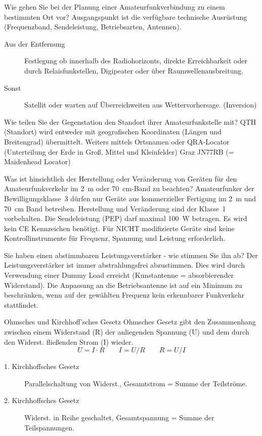 \documentclass[avery5371,grid,frame,a4paper]{flashcards}
\newcommand{\card}[3]{
  \begin{flashcard}[{\chap} -- #1]{#2}#3\end{flashcard}
}
\newcommand\class[1]{{\footnotesize [Klassen: #1]}}
\begin{document}
\card{35}{Wie gehen Sie bei der Planung einer Amateurfunkverbindung zu einem bestimmten Ort vor?}{
  Ausgangspunkt ist die verfügbare technische Ausrüstung (Frequenzband, Sendeleistung, Betriebsarten, Antennen).

  \begin{description}
    \item[Aus der Entfernung] Festlegung ob innerhalb des Radiohorizonts, direkte Erreichbarkeit oder durch Relaisfunkstellen, Digipeater oder über Raumwellenausbreitung.
    \item[Sonst] Satellit oder warten auf Überreichweiten aus Wettervorhersage. (Inversion)
  \end{description}
}
\card{36}{Wie teilen Sie der Gegenstation den Standort ihrer Amateurfunkstelle mit?}{
  QTH (Standort) wird entweder mit geografischen Koordinaten (Längen und Breitengrad) übermittelt. Weiters mittels Ortsnamen oder QRA-Locator (Unterteilung der Erde in Groß, Mittel und Kleinfelder) Graz JN77RB (= Maidenhead Locator)
}
\card{37}{Was ist hinsichtlich der Herstellung oder Veränderung von Geräten für den Amateurfunkverkehr im 2~m oder \SI{70}{\centi\metre}-Band zu beachten?}{
  Amateurfunker der Bewilligungsklasse~3 dürfen nur Geräte aus kommerzieller Fertigung im 2~m und \SI{70}{\centi\metre} Band betreiben. Herstellung und Veränderung sind der Klasse~1 vorbehalten. Die Sendeleistung (PEP) darf maximal \SI{100}{\watt} betragen. Es wird kein CE Kennzeichen benötigt. Für NICHT modifizierte Geräte sind keine  Kontrollinstrumente für Frequenz, Spannung und Leistung erforderlich.
}
\card{38}{Sie haben einen abstimmbaren Leistungsverstärker - wie stimmen Sie ihn ab?}{
  Der Leistungsverstärker ist immer abstrahlungsfrei abzustimmen. Dies wird durch Verwendung einer Dummy Load erreicht (Kunstantenne = absorbierender Widerstand). Die Anpassung an die Betriebsantenne ist auf ein Minimum zu beschränken, wenn auf der gewählten Frequenz kein erkennbarer Funkverkehr stattfindet.
}

\def\chap{Technische Grundlagen \class{1}}

\card{01}{Ohmsches und Kirchhoff’sches Gesetz}{\small
Ohmsches Gesetz  gibt den Zusammenhang zwischen einem Widerstand  (R) der anliegenden 
Spannung (U) und dem durch den Widerst. fließenden Strom (I) wieder.
\[ U = I \cdot R  \qquad  I = U / R \qquad R = U / I \]
\begin{description}
  \item[1. Kirchhoffsches Gesetz] Parallelschaltung von Widerst., Gesamtstrom = Summe der Teilströme.
  \item[2. Kirchhoffsches Gesetz] Widerst. in Reihe geschaltet, Gesamtspannung = Summe der Teilspannungen.
\end{description}}
\end{document}
